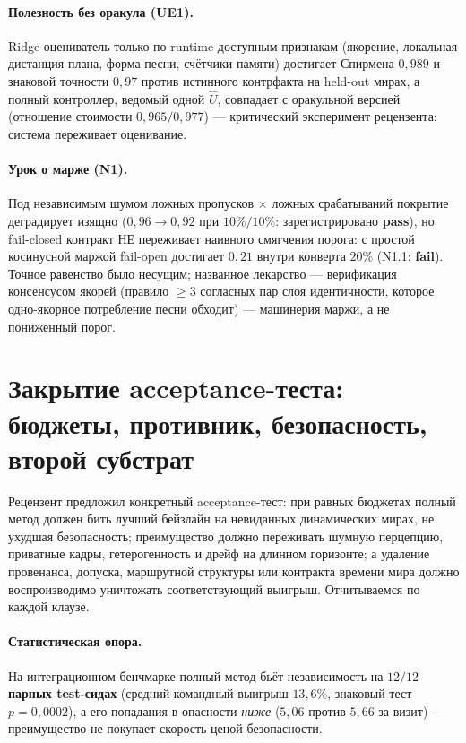 \documentclass{article}
\begin{document}
\paragraph{Полезность без оракула (UE1).} Ridge-оцениватель только по
runtime-доступным признакам (якорение, локальная дистанция плана,
форма песни, счётчики памяти) достигает Спирмена $0{,}989$ и знаковой
точности $0{,}97$ против истинного контрфакта на held-out мирах, а
полный контроллер, ведомый одной $\widehat U$, совпадает с оракульной
версией (отношение стоимости $0{,}965/0{,}977$) --- критический
эксперимент рецензента: система переживает оценивание.

\paragraph{Урок о марже (N1).} Под независимым шумом ложных
пропусков $\times$ ложных срабатываний покрытие деградирует изящно
($0{,}96 \to 0{,}92$ при $10\%/10\%$: зарегистрировано
\textbf{pass}), но fail-closed контракт НЕ переживает наивного
смягчения порога: с простой косинусной маржой fail-open достигает
$0{,}21$ внутри конверта $20\%$ (N1.1: \textbf{fail}). Точное
равенство было несущим; названное лекарство --- верификация
консенсусом якорей (правило $\ge 3$ согласных пар слоя идентичности,
которое одно-якорное потребление песни обходит) --- машинерия маржи,
а не пониженный порог.


\section{Закрытие acceptance-теста: бюджеты, противник, безопасность,
второй субстрат}
\label{sec:acceptance}

Рецензент предложил конкретный acceptance-тест: при равных бюджетах
полный метод должен бить лучший бейзлайн на невиданных динамических
мирах, не ухудшая безопасность; преимущество должно переживать шумную
перцепцию, приватные кадры, гетерогенность и дрейф на длинном
горизонте; а удаление провенанса, допуска, маршрутной структуры или
контракта времени мира должно воспроизводимо уничтожать
соответствующий выигрыш. Отчитываемся по каждой клаузе.

\paragraph{Статистическая опора.} На интеграционном бенчмарке полный
метод бьёт независимость на \textbf{$12/12$ парных test-сидах}
(средний командный выигрыш $13{,}6\%$, знаковый тест $p = 0{,}0002$),
а его попадания в опасности \emph{ниже} ($5{,}06$ против $5{,}66$ за
визит) --- преимущество не покупает скорость ценой безопасности.
\end{document}
